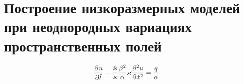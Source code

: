 \chapter{Построение низкоразмерных моделей при неоднородных вариациях пространственных полей}\label{ch:ch4}



\begin{align}
    \deriv{u}{\check{t}}
    - \frac{\check{\varkappa}}{\varkappa}
    \frac{\beta^2}{\alpha}  \varkappa \deriv[2]{u}{\check{x}} = \frac{q}{\alpha}
\end{align}

\begin{figure}[ht]
    \caption{~\cite{Elizarev2022}}\label{fig:q-domains}
\end{figure}

\begin{figure}[ht]
    \caption{~\cite{Elizarev2022}}\label{fig:q-domains}
\end{figure}
